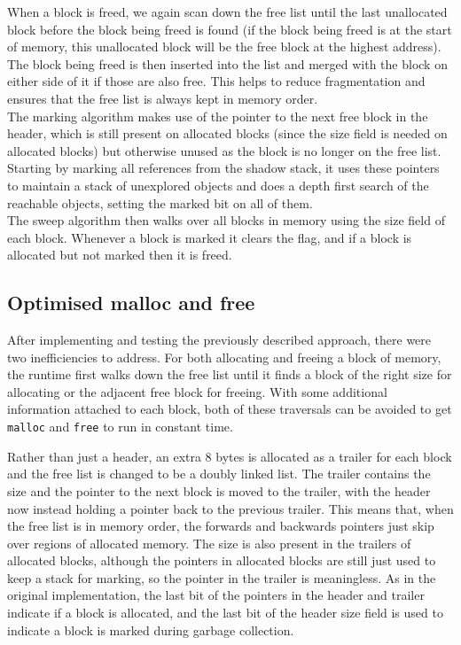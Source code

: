 When a block is freed, we again scan down the free list until the last unallocated block before the block being freed is found (if the block being freed is at the start of memory, this unallocated block will be the free block at the highest address). The block being freed is then inserted into the list and merged with the block on either side of it if those are also free. This helps to reduce fragmentation and ensures that the free list is always kept in memory order.\\


The marking algorithm makes use of the pointer to the next free block in the header, which is still present on allocated blocks (since the size field is needed on allocated blocks) but otherwise unused as the block is no longer on the free list. Starting by marking all references from the shadow stack, it uses these pointers to maintain a stack of unexplored objects and does a depth first search of the reachable objects, setting the marked bit on all of them. \\
The sweep algorithm then walks over all blocks in memory using the size field of each block. Whenever a block is marked it clears the flag, and if a block is allocated but not marked then it is freed.


\subsection{Optimised malloc and free}
After implementing and testing the previously described approach, there were two inefficiencies to address. For both allocating and freeing a block of memory, the runtime first walks down the free list until it finds a block of the right size for allocating or the adjacent free block for freeing. With some additional information attached to each block, both of these traversals can be avoided to get \verb|malloc| and \verb|free| to run in constant time. 

Rather than just a header, an extra 8 bytes is allocated as a trailer for each block and the free list is changed to be a doubly linked list. The trailer contains the size and the pointer to the next block is moved to the trailer, with the header now instead holding a pointer back to the previous trailer. This means that, when the free list is in memory order, the forwards and backwards pointers just skip over regions of allocated memory. The size is also present in the trailers of allocated blocks, although the pointers in allocated blocks are still just used to keep a stack for marking, so the pointer in the trailer is meaningless. As in the original implementation, the last bit of the pointers in the header and trailer indicate if a block is allocated, and the last bit of the header size field is used to indicate a block is marked during garbage collection.

